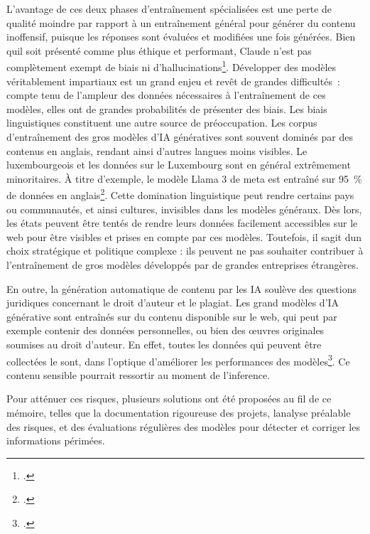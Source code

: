 	L'avantage de ces deux phases d'entraînement spécialisées est une perte de qualité moindre par rapport à un entraînement général pour générer du contenu inoffensif, puisque les réponses sont évaluées et modifiées une fois générées. Bien qu\textquotesingle il
	soit présenté comme plus éthique et performant, Claude n'est pas complètement exempt
	de biais ni d'hallucinations\footcite{priyanshu_ai_2024}.
	Développer des modèles véritablement impartiaux est un grand enjeu et
	revêt de grandes difficultés~: compte tenu de l'ampleur des données
	nécessaires à l'entraînement de ces modèles, elles ont de grandes
	probabilités de présenter des biais. Les biais linguistiques constituent
	une autre source de préoccupation. Les corpus d'entraînement des gros
	modèles d'IA génératives sont souvent dominés par des contenus en
	anglais, rendant ainsi d'autres langues moins visibles. Le
	luxembourgeois et les données sur le Luxembourg sont en général
	extrêmement minoritaires. À titre d'exemple, le modèle Llama 3 de meta
	est entraîné sur 95~\% de données en anglais\footcite{meta}. Cette
	domination linguistique peut rendre certains pays ou communautés, et
	ainsi cultures, invisibles dans les modèles généraux. Dès lors, les
	états peuvent être tentés de rendre leurs données facilement accessibles
	sur le web pour être visibles et prises en compte par ces modèles.
	Toutefois, il s\textquotesingle agit d\textquotesingle un choix
	stratégique et politique complexe : ils peuvent ne pas
	souhaiter contribuer à l'entraînement de gros modèles développés par de
	grandes entreprises étrangères. 

	En outre, la génération automatique de contenu par les IA soulève des
	questions juridiques concernant le droit d'auteur et le plagiat. Les
	grand modèles d'IA générative sont entraînés sur du contenu disponible
	sur le web, qui peut par exemple contenir des données personnelles, ou
	bien des œuvres originales soumises au droit d'auteur. En effet, toutes les données qui peuvent être collectées le sont, dans l'optique d'améliorer les performances des modèles\footcite{crawford_contre-atlas_2023}. Ce contenu sensible
	pourrait ressortir au moment de l'\gls{inference}. 
	
	
	Pour atténuer ces risques, plusieurs solutions ont été proposées au fil de ce mémoire, telles
	que la documentation rigoureuse des projets,
	l\textquotesingle analyse préalable des risques, et des évaluations
	régulières des modèles pour détecter et corriger les informations
	périmées.
	
